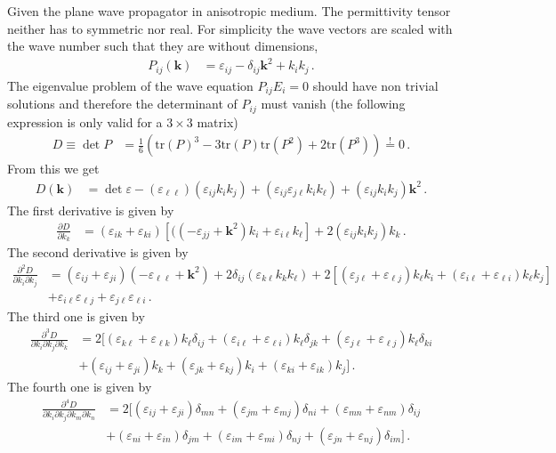 \documentclass[12pt,a4paper,twoside,openright,BCOR10mm,headsepline,titlepage,abstracton,chapterprefix,final]{scrreprt}
\newcommand{\vct}[1]{\mathbf{#1}}
\newcommand{\eps}[1]{\varepsilon_{#1}}
\newcommand{\deteps}{\det \varepsilon}
\newcommand{\tr}[1]{\text{tr}\left(#1\right)}
\begin{document}
Given the plane wave propagator in anisotropic medium. The permittivity tensor neither has to symmetric nor real.
For simplicity the wave vectors are scaled with the wave number such that they are without dimensions,
\begin{align}
 P_{ij}(\vct{k}) &= \eps{ij} - \delta_{ij} \vct{k}^2 + k_i k_j\,.
\end{align}
The eigenvalue problem of the wave equation $P_{ij} E_i = 0$ should have non trivial solutions and therefore the determinant of $P_{ij}$
must vanish (the following expression is only valid for a $3\times3$ matrix)
\begin{align}
 D \equiv \det P &= \frac{1}{6} (\tr{P}^3 - 3 \tr{P} \tr{P^2} + 2 \tr{P^3}) \stackrel{!}{=} 0\,.
\end{align}
From this we get
\begin{align}
 D(\vct{k}) &= \deteps - (\eps{\ell\ell}) (\eps{ij} k_i k_j) + (\eps{ij} \eps{j \ell} k_i k_\ell) + (\eps{ij} k_i k_j) \vct{k}^2\,. 
\end{align}
The first derivative is given by
\begin{align}
 \frac{\partial D}{\partial k_k} &= (\eps{ik} + \eps{ki}) [((-\eps{jj} + \vct{k}^2)k_i + \eps{i\ell} k_\ell] + 2(\eps{ij} k_i k_j) k_k\,. 
\end{align}
The second derivative is given by
\begin{align}
 \frac{\partial^2 D}{\partial k_i \partial k_j} &= (\eps{ij} + \eps{ji})(-\eps{\ell\ell} + \vct{k}^2) + 2 \delta_{ij} (\eps{k\ell} k_k k_\ell)
  + 2[(\eps{j \ell} + \eps{\ell j}) k_\ell k_i + (\eps{i \ell} + \eps{\ell i}) k_\ell k_j] \nonumber\\
  &+ \eps{i \ell} \eps{\ell j} + \eps{j \ell} \eps{\ell i}\,.
\end{align}
The third one is given by
\begin{align}
 \frac{\partial^3 D}{\partial k_i \partial k_j \partial k_k} &= 2 \biggl[
  (\eps{k\ell} + \eps{\ell k})k_\ell \delta_{ij}
  + (\eps{i\ell} + \eps{\ell i})k_\ell \delta_{jk}
  + (\eps{j\ell} + \eps{\ell j})k_\ell \delta_{ki} \nonumber\\&
  + (\eps{ij} + \eps{ji}) k_k
  + (\eps{jk} + \eps{kj}) k_i
  + (\eps{ki} + \eps{ik}) k_j
 \biggr]\,.
\end{align}
The fourth one is given by
\begin{align}
 \frac{\partial^4 D}{\partial k_i \partial k_j \partial k_m \partial k_n} &= 2 \biggl[
  (\eps{ij} + \eps{ji}) \delta_{mn}
  +(\eps{jm} + \eps{mj}) \delta_{ni}
  +(\eps{mn} + \eps{nm}) \delta_{ij} \nonumber\\&
  +(\eps{ni} + \eps{in}) \delta_{jm}
  +(\eps{im} + \eps{mi}) \delta_{nj}
  +(\eps{jn} + \eps{nj}) \delta_{im}  
 \biggr]\,.
\end{align}
\end{document}
